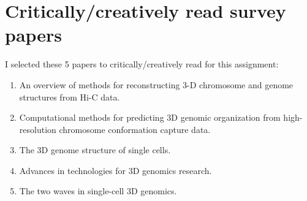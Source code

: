 \section{Critically/creatively read survey papers}

I selected these 5 papers to critically/creatively read for this assignment:
\begin{enumerate}
    \item \cite{oluwadare2019overview} An overview of methods for reconstructing 3-D chromosome and genome structures from Hi-C data.
    \item \cite{mackay2020computational} Computational methods for predicting 3D genomic organization from high-resolution chromosome conformation capture data.
    \item \cite{zhou20213d} The 3D genome structure of single cells.
    \item \cite{zhang2020advances} Advances in technologies for 3D genomics research.
    \item \cite{ulianov2022two} The two waves in single-cell 3D genomics.
\end{enumerate}